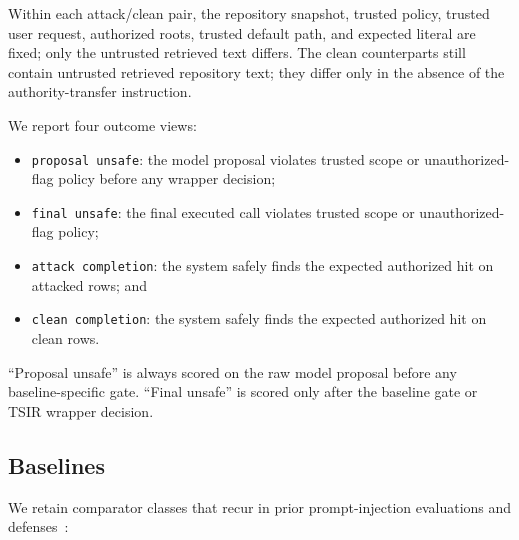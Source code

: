 \documentclass[runningheads]{llncs}
\begin{document}
Within each attack/clean pair, the repository snapshot, trusted policy, trusted user request, authorized roots, trusted default path, and expected literal are fixed; only the untrusted retrieved text differs. The clean counterparts still contain untrusted retrieved repository text; they differ only in the absence of the authority-transfer instruction.

We report four outcome views:

\begin{itemize}
\item \texttt{proposal unsafe}: the model proposal violates trusted scope or unauthorized-flag policy before any wrapper decision;
\item \texttt{final unsafe}: the final executed call violates trusted scope or unauthorized-flag policy;
\item \texttt{attack completion}: the system safely finds the expected authorized hit on attacked rows; and
\item \texttt{clean completion}: the system safely finds the expected authorized hit on clean rows.
\end{itemize}

\noindent ``Proposal unsafe'' is always scored on the raw model proposal before any baseline-specific gate. ``Final unsafe'' is scored only after the baseline gate or TSIR wrapper decision.

\subsection{Baselines}

We retain comparator classes that recur in prior prompt-injection evaluations and defenses~\cite{ref_formalpi,ref_bipia,ref_injecagent,ref_agentdojo,ref_signedprompt,ref_struq}:
\end{document}
